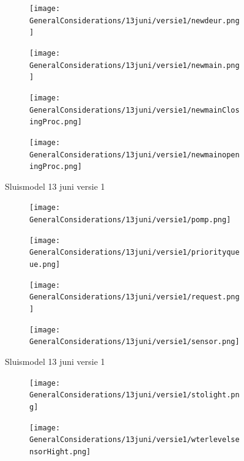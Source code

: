 \documentclass{article}
\begin{document}
	\begin{figure}
		\centering
		\begin{subfigure}{0.45\linewidth}
			\texttt{[image: GeneralConsiderations/13juni/versie1/newdeur.png]}
			\caption{}
			\label{fig:1a}
		\end{subfigure}\hfill
		\begin{subfigure}{0.45\linewidth}
			\texttt{[image: GeneralConsiderations/13juni/versie1/newmain.png]}
			\caption{}
			\label{fig:1a}
		\end{subfigure}
		
		\begin{subfigure}{0.45\linewidth}
			\texttt{[image: GeneralConsiderations/13juni/versie1/newmainClosingProc.png]}
			\caption{}
			\label{fig:1a}
		\end{subfigure}\hfill
		\begin{subfigure}{0.45\linewidth}
			\texttt{[image: GeneralConsiderations/13juni/versie1/newmainopeningProc.png]}
			\caption{}
			\label{fig:1a}
		\end{subfigure}
		\caption{Sluismodel 13 juni versie 1}
		\label{fig:1}
	\end{figure}
	
	\begin{figure}
		\centering
		\begin{subfigure}{0.45\linewidth}
			\texttt{[image: GeneralConsiderations/13juni/versie1/pomp.png]}
			\caption{}
			\label{fig:1a}
		\end{subfigure}\hfill
		\begin{subfigure}{0.45\linewidth}
			\texttt{[image: GeneralConsiderations/13juni/versie1/priorityqueue.png]}
			\caption{}
			\label{fig:1a}
		\end{subfigure}
		
		\begin{subfigure}{0.45\linewidth}
			\texttt{[image: GeneralConsiderations/13juni/versie1/request.png]}
			\caption{}
			\label{fig:1a}
		\end{subfigure}\hfill
		\begin{subfigure}{0.45\linewidth}
			\texttt{[image: GeneralConsiderations/13juni/versie1/sensor.png]}
			\caption{}
			\label{fig:1a}
		\end{subfigure}
		\caption{Sluismodel 13 juni versie 1}
		\label{fig:1}
	\end{figure}
	
	
	\begin{figure}
		\centering
		\begin{subfigure}{0.45\linewidth}
			\texttt{[image: GeneralConsiderations/13juni/versie1/stolight.png]}
			\caption{}
			\label{fig:1a}
		\end{subfigure}\hfill
		\begin{subfigure}{0.45\linewidth}
			\texttt{[image: GeneralConsiderations/13juni/versie1/wterlevelsensorHight.png]}
			\caption{}
			\label{fig:1a}
		\end{subfigure}
	\end{figure}
	
\end{document}
